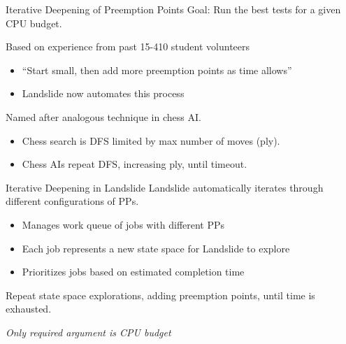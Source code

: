 \documentclass[xcolor=dvipsnames]{beamer}
\begin{document}
\begin{frame}{Iterative Deepening of Preemption Points}
	Goal: Run the best tests for a given CPU budget.

	Based on experience from past 15-410 student volunteers
	\begin{itemize}
		\item ``Start small, then add more preemption points as time allows''
		\item Landslide now automates this process
	\end{itemize}
	\linegap

	Named after analogous technique in chess AI.
	\begin{itemize}
		\item Chess search is DFS limited by max number of moves (ply).
		\item Chess AIs repeat DFS, increasing ply, until timeout.
	\end{itemize}
\end{frame}

\begin{frame}{Iterative Deepening in Landslide}
	Landslide automatically iterates through different configurations of PPs.
	\begin{itemize}
		\item Manages work queue of jobs with different PPs
		\item Each job represents a new state space for Landslide to explore
		\item Prioritizes jobs based on estimated completion time
	\end{itemize}
	\linegap

	Repeat state space explorations, adding preemption points, until time is exhausted.

	\linegap
	{\em Only required argument is CPU budget}
\end{frame}
\end{document}
